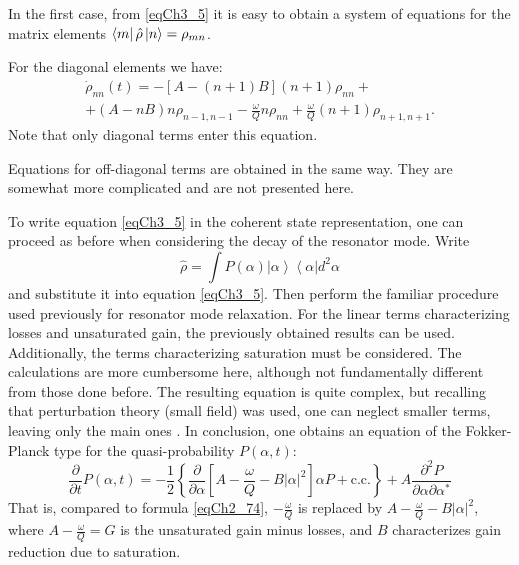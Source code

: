 In the first case, from \eqref{eqCh3_5} it is easy to obtain a system of equations for the matrix elements $\bra{m}\hat{\rho}\ket{n} = \rho_{mn}$.  

For the diagonal elements we have:
\begin{eqnarray}
\dot{\rho}_{nn}\left(t\right) = 
-\left[A - \left(n + 1\right)B\right]\left(n + 1\right)\rho_{nn} +
\nonumber \\
+ \left(A - n B\right)n \rho_{n - 1, n - 1} 
- \frac{\omega}{Q}n \rho_{nn} + 
\frac{\omega}{Q} \left(n + 1\right)\rho_{n + 1, n + 1}.
\label{eqCh3_6}
\end{eqnarray}
Note that only diagonal terms enter this equation.

Equations for off-diagonal terms are obtained in the same way.
They are somewhat more complicated and are not presented here.

To write equation \eqref{eqCh3_5} in the coherent state representation,
one can proceed as before when considering the decay of the resonator mode.
Write 
\[
\hat{\rho} = \int
P\left(\alpha\right)\left|\alpha\right>\left<\alpha\right| d^2 \alpha 
\]
and substitute it into equation \eqref{eqCh3_5}. Then perform the familiar procedure used previously for resonator mode relaxation. For the linear terms characterizing losses and unsaturated gain, the previously obtained results can be used. Additionally, the terms characterizing saturation must be considered. The calculations are more cumbersome here, although not fundamentally different from those done before. The resulting equation is quite complex, but recalling that perturbation theory (small field) was used, one can neglect smaller terms, leaving only the main ones \cite{bMandel2000}. 
In conclusion, one obtains an equation of the Fokker-Planck type for the quasi-probability
$P\left(\alpha, t\right)$:  
\begin{equation}
\frac{\partial}{\partial t} P\left(\alpha, t\right) = 
- \frac{1}{2}\left\{ 
\frac{\partial}{\partial \alpha}
\left[
A - \frac{\omega}{Q} - B \left|\alpha\right|^2
\right] \alpha P + \mbox{c.c.}
\right\} + 
A \frac{\partial^2 P}{\partial \alpha \partial \alpha^{*}}
\label{eqCh3_7}
\end{equation}
That is, compared to formula \eqref{eqCh2_74}, $-\frac{\omega}{Q}$
is replaced by $A - \frac{\omega}{Q} - B\left|\alpha\right|^2$, where $A
- \frac{\omega}{Q} = G$ is the unsaturated gain minus losses, and $B$  
characterizes gain reduction due to saturation. 
